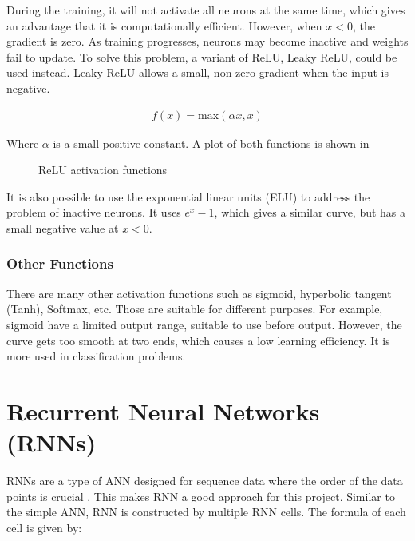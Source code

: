 During the training, it will not activate all neurons at the same time, which gives an advantage that it is computationally efficient.
However, when $x < 0$, the gradient is zero. As training progresses, neurons may become inactive and weights fail to update.
To solve this problem, a variant of ReLU, Leaky ReLU, could be used instead. Leaky ReLU allows a small, non-zero gradient when the input is negative.

\begin{gather}
    f(x) = \mathrm{max}(\alpha x, x) 
\end{gather}

Where $\alpha$ is a small positive constant. A plot of both functions is shown in 

\begin{figure}[!htb]
    \centering
    \caption{ReLU activation functions}
    \label{Figure:ReLUplots}
\end{figure}

It is also possible to use the exponential linear units (ELU) to address the problem of inactive neurons. 
It uses $e^x-1$, which gives a similar curve, but has a small negative value at $x < 0$. 

\subsubsection{Other Functions}

There are many other activation functions such as sigmoid, hyperbolic tangent (Tanh), Softmax, etc.
Those are suitable for different purposes. For example, sigmoid have a limited output range, suitable to use before output. 
However, the curve gets too smooth at two ends, which causes a low learning efficiency. It is more used in classification problems. 

\section{Recurrent Neural Networks (RNNs)}

RNNs are a type of ANN designed for sequence data where the order of the data points is crucial \cite{lipton2015critical}. 
This makes RNN a good approach for this project. Similar to the simple ANN, RNN is constructed by multiple RNN cells. The formula of each cell is given by:

